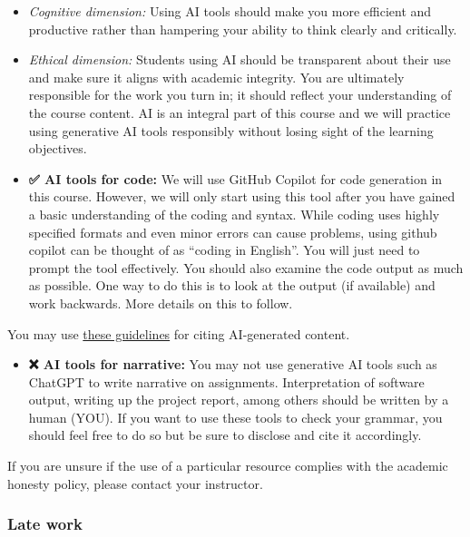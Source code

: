 \documentclass[
  letterpaper,
  DIV=11,
  numbers=noendperiod]{scrartcl}
\providecommand{\tightlist}{%
  \setlength{\itemsep}{0pt}\setlength{\parskip}{0pt}}\usepackage{longtable,booktabs,array}
\begin{document}
\begin{itemize}
  \begin{itemize}
  \item
    \emph{Cognitive dimension:} Using AI tools should make you more
    efficient and productive rather than hampering your ability to think
    clearly and critically.
  \item
    \emph{Ethical dimension:} Students using AI should be transparent
    about their use and make sure it aligns with academic integrity. You
    are ultimately responsible for the work you turn in; it should
    reflect your understanding of the course content. AI is an integral
    part of this course and we will practice using generative AI tools
    responsibly without losing sight of the learning objectives.
  \item
    \textbf{✅ AI tools for code:} We will use GitHub Copilot for code
    generation in this course. However, we will only start using this
    tool after you have gained a basic understanding of the coding and
    syntax. While coding uses highly specified formats and even minor
    errors can cause problems, using github copilot can be thought of as
    ``coding in English''. You will just need to prompt the tool
    effectively. You should also examine the code output as much as
    possible. One way to do this is to look at the output (if available)
    and work backwards. More details on this to follow.
  \end{itemize}

  You may use
  \href{https://guides.lib.monash.edu/c.php?g=219786&p=6972087}{these
  guidelines} for citing AI-generated content.

  \begin{itemize}
  \tightlist
  \item
    \textbf{❌ AI tools for narrative:} You may not use generative AI
    tools such as ChatGPT to write narrative on assignments.
    Interpretation of software output, writing up the project report,
    among others should be written by a human (YOU). If you want to use
    these tools to check your grammar, you should feel free to do so but
    be sure to disclose and cite it accordingly.
  \end{itemize}
\end{itemize}

If you are unsure if the use of a particular resource complies with the
academic honesty policy, please contact your instructor.

\subsubsection{Late work}\label{late-work}
\end{document}
